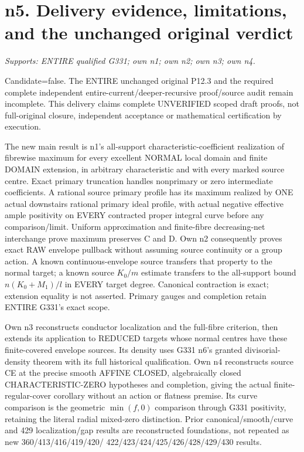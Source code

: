 \section{n5. Delivery evidence, limitations, and the unchanged original verdict}
\textit{Supports: ENTIRE qualified G331; own n1; own n2; own n3; own n4.}

Candidate=false. The ENTIRE unchanged original P12.3 and the required
complete independent entire-current/deeper-recursive proof/source audit
remain incomplete. This delivery claims complete UNVERIFIED scoped draft
proofs, not full-original closure, independent acceptance or mathematical
certification by execution.

The new main result is n1's all-support characteristic-coefficient
realization of fibrewise maximum for every excellent NORMAL local domain
and finite DOMAIN extension, in arbitrary characteristic and with every
marked source centre. Exact primary truncation handles nonprimary or zero
intermediate coefficients. A rational source primary profile has its
maximum realized by ONE actual downstairs rational primary ideal profile,
with actual negative effective ample positivity on EVERY contracted proper
integral curve before any comparison/limit. Uniform approximation and
finite-fibre decreasing-net interchange prove maximum preserves C and D.
Own n2 consequently proves exact RAW envelope pullback without assuming
source continuity or a group action. A known continuous-envelope source
transfers that property to the normal target; a known source $K_0/m$
estimate transfers to the all-support bound $n(K_0+M_1)/l$ in EVERY
target degree. Canonical contraction is exact; extension equality is not
asserted. Primary gauges and completion retain ENTIRE G331's exact scope.

Own n3 reconstructs conductor localization and the full-fibre criterion,
then extends its application to REDUCED targets whose normal centres have
these finite-covered envelope sources. Its density uses G331 n6's granted
divisorial-density theorem with its full historical qualification.
Own n4 reconstructs source CE at the precise smooth AFFINE CLOSED,
algebraically closed CHARACTERISTIC-ZERO hypotheses and completion,
giving the actual finite-regular-cover corollary without an action or
flatness premise. Its curve comparison is the geometric $\min(f,0)$
comparison through G331 positivity, retaining the literal radial mixed-zero
distinction. Prior canonical/smooth/curve and 429 localization/gap results
are reconstructed foundations, not repeated as new 360/413/416/419/420/
422/423/424/425/426/428/429/430 results.

